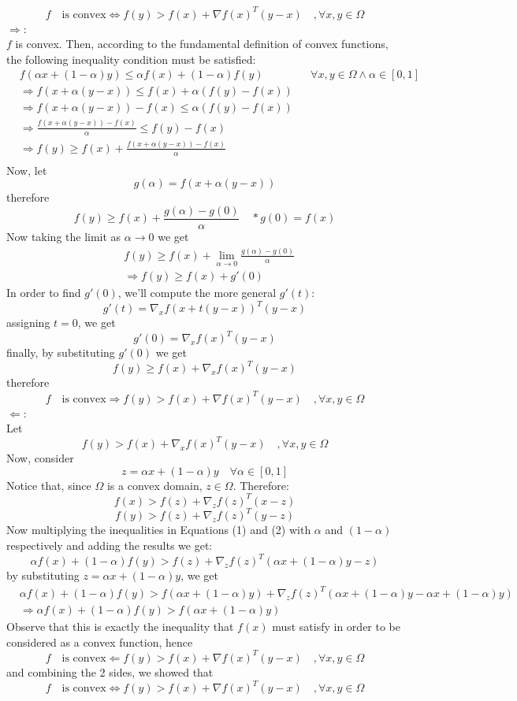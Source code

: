 \documentclass{article}
\begin{document}
\begin{enumerate}[(a)]
\[f \quad\text{is convex}\Leftrightarrow f(y) > f(x)+\nabla f(x)^T(y-x)\quad,\forall x,y \in \Omega \]
$\Rightarrow$:\\
$f$ is convex. Then, according to the fundamental definition of convex functions, the following inequality condition must be satisfied:
\begin{align*}
&f(\alpha x + (1-\alpha)y) \le \alpha f(x)+ (1-\alpha)f(y)&&\forall x,y \in \Omega \land \alpha \in [0,1]\\
&\Rightarrow f(x+\alpha (y-x)) \le f(x)+ \alpha(f(y)-f(x))\\
&\Rightarrow f(x+\alpha (y-x))-f(x) \le \alpha(f(y)-f(x))\\
&\Rightarrow \frac{f(x+\alpha (y-x))-f(x) }{\alpha}\le f(y)-f(x)\\
&\Rightarrow f(y)\ge f(x)+\frac{f(x+\alpha (y-x))-f(x) }{\alpha} \\
\end{align*}
Now, let
\[g(\alpha)=f(x+\alpha (y-x))\]
therefore
\[f(y)\ge f(x)+\frac{g(\alpha)-g(0) }{\alpha}\quad * g(0) = f(x)\]
Now taking the limit as $\alpha \rightarrow 0$ we get
\begin{align*}
&f(y)\ge f(x)+\lim_{\alpha \to 0}\frac{g(\alpha)-g(0) }{\alpha}\\
&\Rightarrow f(y)\ge f(x)+g'(0)
\end{align*}
In order to find $g'(0)$, we'll compute the more general $g'(t)$:
\[g'(t) = \nabla_xf(x+t(y-x))^T(y-x)\]
assigning $t=0$, we get
\[g'(0) =\nabla_xf(x)^T(y-x) \]
finally, by substituting $g'(0)$ we get
\[f(y)\ge f(x)+\nabla_xf(x)^T(y-x)\] 
therefore
\[f \quad\text{is convex}\Rightarrow f(y) > f(x)+\nabla f(x)^T(y-x)\quad,\forall x,y \in \Omega \]
$\Leftarrow$:\\
Let
\[ f(y) > f(x)+\nabla_x f(x)^T(y-x)\quad,\forall x,y \in \Omega\]
Now, consider
\[z= \alpha x+(1-\alpha)y\quad \forall \alpha \in [0,1]\]
Notice that, since $\Omega$ is a convex domain, $z \in \Omega$. Therefore:
\begin{equation}
f(x) > f(z)+\nabla_z f(z)^T(x-z)
\end{equation}
\begin{equation}
f(y) > f(z)+\nabla_z f(z)^T(y-z)
\end{equation}
Now multiplying the inequalities in Equations (1) and (2) with $\alpha$ and $(1-\alpha)$ respectively and adding the results we get:
\[\alpha f(x) + (1-\alpha)f(y) > f(z)+\nabla_z f(z)^T(\alpha x+(1-\alpha)y-z)\]
by substituting $z= \alpha x+(1-\alpha)y$, we get
\begin{align*}
&\alpha f(x) + (1-\alpha)f(y) > f(\alpha x+(1-\alpha)y)+\nabla_z f(z)^T(\alpha x+(1-\alpha)y-\alpha x+(1-\alpha)y)\\
&\Rightarrow \alpha f(x) + (1-\alpha)f(y) > f(\alpha x+(1-\alpha)y)
\end{align*}
Observe that this is exactly the inequality that $f(x)$ must satisfy in order to be considered as a convex function, hence
\[f \quad\text{is convex}\Leftarrow f(y) > f(x)+\nabla f(x)^T(y-x)\quad,\forall x,y \in \Omega \] 
and combining the 2 sides, we showed that
\[f \quad\text{is convex}\Leftrightarrow f(y) > f(x)+\nabla f(x)^T(y-x)\quad,\forall x,y \in \Omega \]
\end{enumerate}
\end{document}

